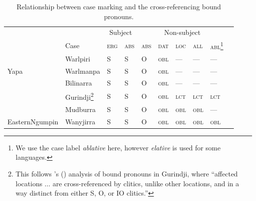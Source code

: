 \documentclass[output=paper,colorlinks,citecolor=brown]{langscibook}
\begin{document}
\begin{table}

\caption{Relationship between case marking and the cross-referencing bound pronouns.}
\label{tab4-bro}
\begin{tabularx}{\textwidth}{lX ll @{\quad} llllll}
\lsptoprule
 & & \multicolumn{2}{c}{ {Subject}} & \multicolumn{5}{c}{ {Non-subject}} &  \\
 & {Case} & {\textsc{erg}} & {\textsc{abs}} & {\textsc{abs}} & {\textsc{dat}} & {\textsc{loc}} & {\textsc{all}} & {\textsc{abl}}\footnote{We use the case label \textit{ablative} here, however \textit{elative} is used for some languages.} &  \\
 \midrule
 & Warlpiri & \cellcolor[HTML]{8D8D8D}S & \cellcolor[HTML]{8D8D8D}S & \cellcolor[HTML]{9B9B9B}O & \cellcolor[HTML]{C0C0C0}\textsc{obl} & --- & --- & --- &  \\
\multirow{-2}{15mm}{Yapa} & Warlmanpa & \cellcolor[HTML]{8D8D8D}S & \cellcolor[HTML]{8D8D8D}S & \cellcolor[HTML]{9B9B9B}O & \cellcolor[HTML]{C0C0C0}\textsc{obl} & --- & --- & --- &  \\

\tablevspace

& Bilinarra & \cellcolor[HTML]{8D8D8D}S & \cellcolor[HTML]{8D8D8D}S & \cellcolor[HTML]{9B9B9B}O & \cellcolor[HTML]{C0C0C0}\textsc{obl} & --- & --- & --- &  \\
 & Gurindji\footnote{This follows \citeauthor{mcconvell_functions_1996}'s (\citeyear[84]{mcconvell_functions_1996}) analysis of bound pronouns in Gurindji, where ``affected locations $\ldots$ are cross-referenced by clitics, unlike other locations, and in a way distinct from either S, O, or IO clitics.''} & \cellcolor[HTML]{8D8D8D}S & \cellcolor[HTML]{8D8D8D}S & \cellcolor[HTML]{9B9B9B}O & \cellcolor[HTML]{C0C0C0}\textsc{obl} & \cellcolor[HTML]{D9D6D6}\textsc{lct} & \cellcolor[HTML]{D9D6D6}\textsc{lct} & \cellcolor[HTML]{D9D6D6}\textsc{lct} &  \\
 & Mudburra & \cellcolor[HTML]{8D8D8D}S & \cellcolor[HTML]{8D8D8D}S & \cellcolor[HTML]{9B9B9B}O & \cellcolor[HTML]{C0C0C0}\textsc{obl} & \cellcolor[HTML]{C0C0C0}\textsc{obl} & \cellcolor[HTML]{C0C0C0}\textsc{obl} & --- &  \\
\multirow{-4}{15mm}{Eastern\newline Ngumpin  } & Wanyjirra & \cellcolor[HTML]{8D8D8D}S & \cellcolor[HTML]{8D8D8D}S & \cellcolor[HTML]{9B9B9B}O & \cellcolor[HTML]{C0C0C0}\textsc{obl} & \cellcolor[HTML]{C0C0C0}\textsc{obl} & \cellcolor[HTML]{C0C0C0}\textsc{obl} & \cellcolor[HTML]{C0C0C0}\textsc{obl} &  \\


\end{tabularx}
\end{table}
\end{document}
